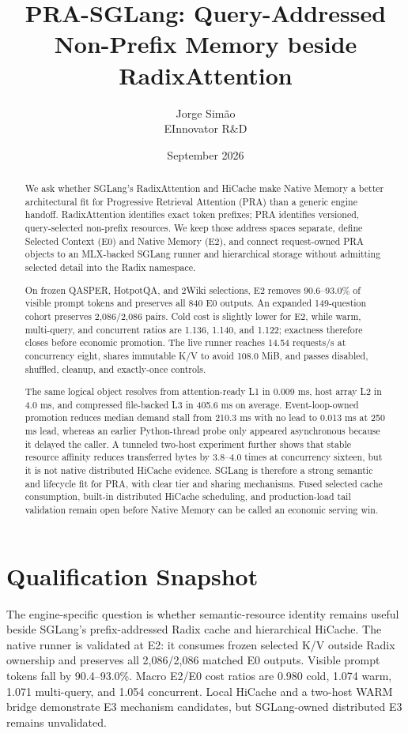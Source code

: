 \documentclass[10pt]{article}
\title{PRA-SGLang: Query-Addressed Non-Prefix Memory beside RadixAttention}
\author{Jorge Sim\~ao\\EInnovator R\&D}
\date{September 2026}
\begin{document}
\maketitle

\begin{abstract}
We ask whether SGLang's RadixAttention and HiCache make Native Memory a better
architectural fit for Progressive Retrieval Attention (PRA) than a generic
engine handoff. RadixAttention identifies exact token prefixes; PRA identifies
versioned, query-selected non-prefix resources. We keep those address spaces
separate, define Selected Context (E0) and Native Memory (E2), and connect
request-owned PRA objects to an MLX-backed SGLang runner and hierarchical
storage without admitting selected detail into the Radix namespace.

On frozen QASPER, HotpotQA, and 2Wiki selections, E2 removes 90.6--93.0\% of
visible prompt tokens and preserves all 840 E0 outputs. An expanded
149-question cohort preserves 2,086/2,086 pairs. Cold cost is slightly lower
for E2, while warm, multi-query, and concurrent ratios are 1.136, 1.140, and
1.122; exactness therefore closes before economic promotion. The live runner
reaches 14.54 requests/s at concurrency eight, shares immutable K/V to avoid
108.0 MiB, and passes disabled, shuffled, cleanup, and exactly-once controls.

The same logical object resolves from attention-ready L1 in 0.009 ms, host
array L2 in 4.0 ms, and compressed file-backed L3 in 405.6 ms on average.
Event-loop-owned promotion reduces median demand stall from 210.3 ms with no
lead to 0.013 ms at 250 ms lead, whereas an earlier Python-thread probe only
appeared asynchronous because it delayed the caller. A tunneled two-host
experiment further shows that stable resource affinity reduces transferred
bytes by 3.8--4.0 times at concurrency sixteen, but it is not native
distributed HiCache evidence. SGLang is therefore a strong semantic and
lifecycle fit for PRA, with clear tier and sharing mechanisms. Fused selected
cache consumption, built-in distributed HiCache scheduling, and
production-load tail validation remain open before Native Memory can be called
an economic serving win.
\end{abstract}

\section{Qualification Snapshot}

The engine-specific question is whether semantic-resource identity remains
useful beside SGLang's prefix-addressed Radix cache and hierarchical HiCache.
The native runner is validated at E2: it consumes frozen selected K/V outside
Radix ownership and preserves all 2,086/2,086 matched E0 outputs. Visible prompt
tokens fall by 90.4--93.0\%. Macro E2/E0 cost ratios are 0.980 cold, 1.074 warm,
1.071 multi-query, and 1.054 concurrent. Local HiCache and a two-host WARM
bridge demonstrate E3 mechanism candidates, but SGLang-owned distributed E3
remains unvalidated.
\end{document}
